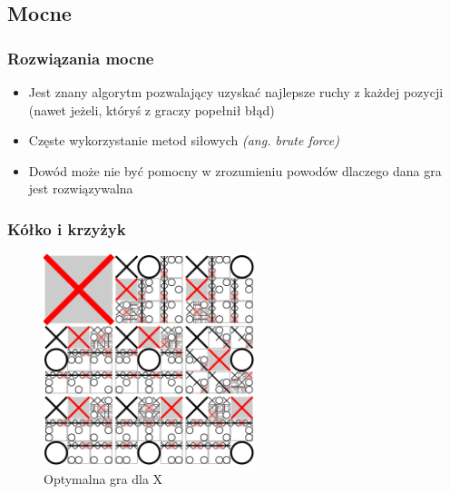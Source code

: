 \documentclass[polish,envcountsect,10pt]{beamer}
\begin{document}
        \subsection{Mocne}
            \begin{frame}
                \frametitle{Rozwiązania mocne}
                \begin{itemize}
                    \item<1-> Jest znany algorytm pozwalający uzyskać najlepsze ruchy z każdej pozycji (nawet jeżeli, któryś z graczy popełnił błąd)
                    \item<2-> Częste wykorzystanie metod siłowych \textit{(ang. brute force)} 
                    \item<3-> Dowód może nie być pomocny w zrozumieniu powodów dlaczego dana gra jest rozwiązywalna
                \end{itemize}
            \end{frame}
            \begin{frame}
                \frametitle{Kółko i krzyżyk}
                \begin{figure}[H]
                    \centering
                    \includegraphics[width=0.55\textwidth,natwidth=480,natheight=480]{images/480px-Tictactoe-X.svg.png}
                    \caption{Optymalna gra dla X}
                \end{figure}
            \end{frame}
\end{document}
